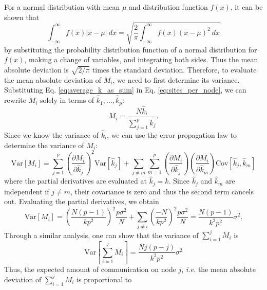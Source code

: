 For a normal distribution with mean $\mu$ and distribution function
$f(x)$, it can be shown that
\begin{equation}
  \int_{-\infty}^{\infty} f(x) \left | x - \mu \right | \: dx =
  \sqrt{\frac{2}{\pi} \int_{-\infty}^{\infty} f(x) \left ( x - \mu
    \right )^2 \: dx}
\end{equation}
by substituting the probability distribution function of a normal
distribution for $f(x)$, making a change of variables, and integrating
both sides. Thus the mean absolute deviation is $\sqrt{2/\pi}$ times
the standard deviation. Therefore, to evaluate the mean absolute
deviation of $M_i$, we need to first determine its
variance. Substituting Eq. \ref{eq:average_k_as_sum} in
Eq. \ref{eq:sites_per_node}, we can rewrite $M_i$ solely in terms of
$\hat{k}_1, \dots, \hat{k}_p$:
\begin{equation}
  M_i = \frac{N \hat{k}_i}{\sum\limits_{j=1}^p \hat{k}_j}.
\end{equation}
Since we know the variance of $\hat{k}_i$, we can use the error
propagation law to determine the variance of $M_i$:
\begin{equation}
  \text{Var} \left [ M_i \right ] = \sum_{j=1}^p \left (
  \frac{\partial M_i}{\partial \hat{k}_j} \right )^2 \text{Var} \left
       [ \hat{k}_j \right ] + \sum\limits_{j \neq m}
       \sum\limits_{m=1}^p \left ( \frac{\partial M_i}{\partial
         \hat{k}_j} \right ) \left ( \frac{\partial M_i}{\partial
         \hat{k}_m} \right ) \text{Cov} \left [ \hat{k}_j, \hat{k}_m
         \right ]
\end{equation}
where the partial derivatives are evaluated at $\hat{k}_j = k$. Since
$\hat{k}_j$ and $\hat{k}_m$ are independent if $j \neq m$, their
covariance is zero and thus the second term cancels out. Evaluating
the partial derivatives, we obtain
\begin{equation}
  \text{Var} \left [ M_i \right ] = \left ( \frac{N(p-1)}{kp^2} \right
  )^2 \frac{p\sigma^2}{N} + \sum_{j \neq i} \left ( \frac{-N}{kp^2}
  \right )^2 \frac{p\sigma^2}{N} = \frac{N(p-1)}{k^2p^2} \sigma^2.
\end{equation}
Through a similar analysis, one can show that the variance of
$\sum_{i=1}^j M_i$ is
\begin{equation}
  \text{Var} \left [ \sum_{i=1}^j M_i \right ] =
  \frac{Nj(p-j)}{k^2p^2} \sigma^2
\end{equation}
Thus, the expected amount of communication on node $j$, {\em i.e.} the
mean absolute deviation of $\sum_{i=1}^j M_i$ is proportional to

